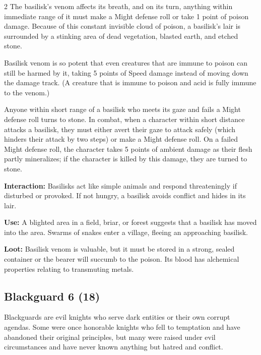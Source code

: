\begin{multicols}{2}
The basilisk’s venom affects its breath, and on its turn, anything within immediate range of it must make a Might defense roll or take 1 point of poison damage. Because of this constant invisible cloud of poison, a basilisk’s lair is surrounded by a stinking area of dead vegetation, blasted earth, and etched stone. 

Basilisk venom is so potent that even creatures that are immune to poison can still be harmed by it, taking 5 points of Speed damage instead of moving down the damage track. (A creature that is immune to poison and acid is fully immune to the venom.) 

Anyone within short range of a basilisk who meets its gaze and fails a Might defense roll turns to stone. In combat, when a character within short distance attacks a basilisk, they must either avert their gaze to attack safely (which hinders their attack by two steps) or make a Might defense roll. On a failed Might defense roll, the character takes 5 points of ambient damage as their flesh partly mineralizes; if the character is killed by this damage, they are turned to stone. 

\textbf{Interaction:} Basilisks act like simple animals and respond threateningly if disturbed or provoked. If not hungry, a basilisk avoids conflict and hides in its lair. 

\textbf{Use:} A blighted area in a field, briar, or forest suggests that a basilisk has moved into the area. Swarms of snakes enter a village, fleeing an approaching basilisk. 

\textbf{Loot:} Basilisk venom is valuable, but it must be stored in a strong, sealed container or the bearer will succumb to the poison. Its blood has alchemical properties relating to transmuting metals.

\subsection{Blackguard 6 (18)}

Blackguards are evil knights who serve dark entities or their own corrupt agendas. Some were once honorable knights who fell to temptation and have abandoned their original principles, but many were raised under evil circumstances and have never known anything but hatred and conflict. 


\end{multicols}
